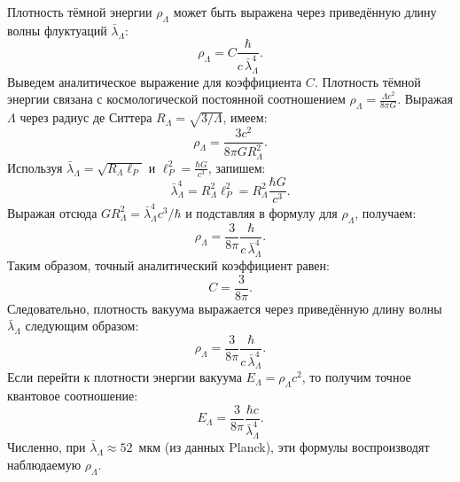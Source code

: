 \documentclass[12pt,a4paper]{article}
\begin{document}
Плотность тёмной энергии $\rho_\Lambda$ может быть выражена через приведённую длину волны флуктуаций $\bar\lambda_\Lambda$:
\begin{equation}
\rho_\Lambda = C \frac{\hbar}{c\,\bar\lambda_\Lambda^4}.
\end{equation}
Выведем аналитическое выражение для коэффициента $C$. Плотность тёмной энергии связана с космологической постоянной соотношением $\rho_\Lambda = \frac{\Lambda c^2}{8\pi G}$. Выражая $\Lambda$ через радиус де Ситтера $R_\Lambda = \sqrt{3/\Lambda}$, имеем:
\begin{equation}
\rho_\Lambda = \frac{3 c^2}{8\pi G R_\Lambda^2}.
\end{equation}
Используя $\bar\lambda_\Lambda = \sqrt{R_\Lambda \ell_P}$ и $\ell_P^2 = \frac{\hbar G}{c^3}$, запишем:
\begin{equation}
\bar\lambda_\Lambda^4 = R_\Lambda^2 \ell_P^2 = R_\Lambda^2 \frac{\hbar G}{c^3}.
\end{equation}
Выражая отсюда $G R_\Lambda^2 = \bar\lambda_\Lambda^4 c^3/\hbar$ и подставляя в формулу для $\rho_\Lambda$, получаем:
\begin{equation}
\rho_\Lambda = \frac{3}{8\pi} \frac{\hbar}{c\,\bar\lambda_\Lambda^4}.
\end{equation}
Таким образом, точный аналитический коэффициент равен:
\begin{equation}
\boxed{C = \frac{3}{8\pi}.}
\end{equation}
Следовательно, плотность вакуума выражается через приведённую длину волны $\bar\lambda_\Lambda$ следующим образом:
\begin{equation}
\boxed{\rho_\Lambda = \frac{3}{8\pi} \frac{\hbar}{c\,\bar\lambda_\Lambda^4}.} \label{eq:rho_lambda_final}
\end{equation}
Если перейти к плотности энергии вакуума $E_\Lambda = \rho_\Lambda c^2$, то получим точное квантовое соотношение:
\begin{equation}
\boxed{E_\Lambda = \frac{3}{8\pi} \frac{\hbar c}{\bar\lambda_\Lambda^4}.}
\end{equation}
Численно, при $\bar\lambda_\Lambda \approx 52$~мкм (из данных Planck), эти формулы воспроизводят наблюдаемую $\rho_\Lambda$.
\end{document}
